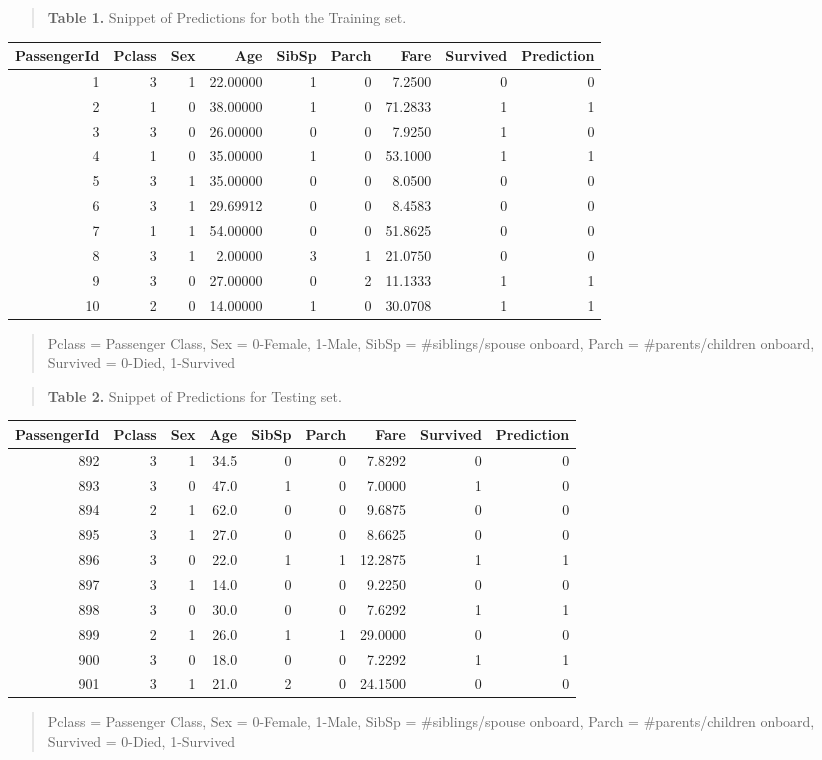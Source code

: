 \documentclass[]{article}
\begin{document}
\begin{quote}
\textbf{Table 1.} Snippet of Predictions for both the Training set.
\end{quote}

\begin{longtable}[]{@{}rrrrrrrrr@{}}
\toprule
PassengerId & Pclass & Sex & Age & SibSp & Parch & Fare & Survived &
Prediction\tabularnewline
\midrule
\endhead
1 & 3 & 1 & 22.00000 & 1 & 0 & 7.2500 & 0 & 0\tabularnewline
2 & 1 & 0 & 38.00000 & 1 & 0 & 71.2833 & 1 & 1\tabularnewline
3 & 3 & 0 & 26.00000 & 0 & 0 & 7.9250 & 1 & 0\tabularnewline
4 & 1 & 0 & 35.00000 & 1 & 0 & 53.1000 & 1 & 1\tabularnewline
5 & 3 & 1 & 35.00000 & 0 & 0 & 8.0500 & 0 & 0\tabularnewline
6 & 3 & 1 & 29.69912 & 0 & 0 & 8.4583 & 0 & 0\tabularnewline
7 & 1 & 1 & 54.00000 & 0 & 0 & 51.8625 & 0 & 0\tabularnewline
8 & 3 & 1 & 2.00000 & 3 & 1 & 21.0750 & 0 & 0\tabularnewline
9 & 3 & 0 & 27.00000 & 0 & 2 & 11.1333 & 1 & 1\tabularnewline
10 & 2 & 0 & 14.00000 & 1 & 0 & 30.0708 & 1 & 1\tabularnewline
\bottomrule
\end{longtable}

\begin{quote}
Pclass = Passenger Class, Sex = 0-Female, 1-Male, SibSp =
\#siblings/spouse onboard, Parch = \#parents/children onboard, Survived
= 0-Died, 1-Survived
\end{quote}

\begin{quote}
\textbf{Table 2.} Snippet of Predictions for Testing set.
\end{quote}

\begin{longtable}[]{@{}rrrrrrrrr@{}}
\toprule
PassengerId & Pclass & Sex & Age & SibSp & Parch & Fare & Survived &
Prediction\tabularnewline
\midrule
\endhead
892 & 3 & 1 & 34.5 & 0 & 0 & 7.8292 & 0 & 0\tabularnewline
893 & 3 & 0 & 47.0 & 1 & 0 & 7.0000 & 1 & 0\tabularnewline
894 & 2 & 1 & 62.0 & 0 & 0 & 9.6875 & 0 & 0\tabularnewline
895 & 3 & 1 & 27.0 & 0 & 0 & 8.6625 & 0 & 0\tabularnewline
896 & 3 & 0 & 22.0 & 1 & 1 & 12.2875 & 1 & 1\tabularnewline
897 & 3 & 1 & 14.0 & 0 & 0 & 9.2250 & 0 & 0\tabularnewline
898 & 3 & 0 & 30.0 & 0 & 0 & 7.6292 & 1 & 1\tabularnewline
899 & 2 & 1 & 26.0 & 1 & 1 & 29.0000 & 0 & 0\tabularnewline
900 & 3 & 0 & 18.0 & 0 & 0 & 7.2292 & 1 & 1\tabularnewline
901 & 3 & 1 & 21.0 & 2 & 0 & 24.1500 & 0 & 0\tabularnewline
\bottomrule
\end{longtable}

\begin{quote}
Pclass = Passenger Class, Sex = 0-Female, 1-Male, SibSp =
\#siblings/spouse onboard, Parch = \#parents/children onboard, Survived
= 0-Died, 1-Survived
\end{quote}
\end{document}
